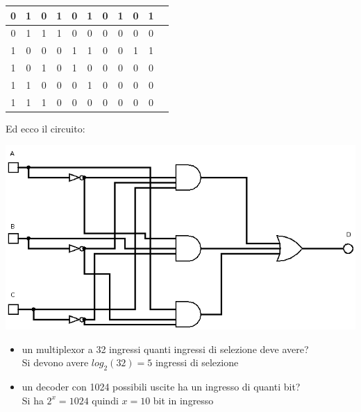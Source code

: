 \documentclass[a4paper,12pt, oneside]{book}
\begin{document}
\begin{esercizio}
\begin{center}
\begin{tabular}{|c|c|c|c|c|c|c|c|c|c|c|}
\hline
0 & 1 & 0 & 1 & 0 & 1 & 0 & 1 & 0 &  1\\
\hline
0 & 1 & 1 & 1 & 0 & 0 & 0 & 0 & 0 &  0\\
\hline
1 & 0 & 0 & 0 & 1 & 1 & 0 & 0 & 1 &  1\\
\hline
1 & 0 & 1 & 0 & 1 & 0 & 0 & 0 & 0 &  0\\
\hline
1 & 1 & 0 & 0 & 0 & 1 & 0 & 0 & 0 &  0\\
\hline
1 & 1 & 1 & 0 & 0 & 0 & 0 & 0 & 0 &  0\\
\hline
\end{tabular}
\end{center}
\newpage
Ed ecco il circuito:
\begin{center}
\includegraphics[scale=0.65]{img/es4.png}
\end{center}
\end{esercizio}
\begin{esercizio}
\begin{itemize}
\item un multiplexor a 32 ingressi quanti ingressi di selezione deve avere?\\
Si devono avere $log_2(32)=5$ ingressi di selezione
\item un decoder con 1024 possibili uscite ha un ingresso di quanti bit?\\
Si ha $2^x=1024$ quindi $x=10$ bit in ingresso

\end{itemize}
\end{esercizio}
\end{document}
